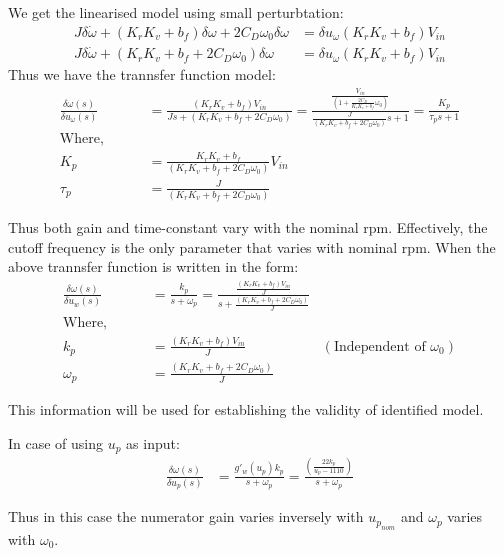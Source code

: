 
We get the linearised model using small perturbtation:
\begin{align*}
     J \delta \dot \omega + (K_r K_v + b_f) \delta \omega + 2 C_D \omega_0 \delta \omega  &= \delta u_\omega (K_r K_v  + b_f)  V_{in}\\
    J \delta \dot \omega + (K_r K_v + b_f + 2 C_D \omega_0) \delta \omega  &=\delta u_\omega (K_r K_v  + b_f)  V_{in}
\end{align*}
Thus we have the trannsfer function model:
\begin{align*}
    \frac{\delta \omega(s)}{\delta u_\omega (s)} &=
    \frac{(K_r K_v  + b_f)  V_{in}}{J s + (K_rK_v + b_f + 2 C_D \omega_0)} = \frac{\frac{V_{in}}{\left(1 + \frac{2 C_D}{K_r K_v + b_f} \omega_0 \right)}}{\frac{J}{(K_r K_v + b_f + 2 C_D \omega_0)}s + 1} = \frac{K_p}{\tau_p s + 1}\\
    \text{Where, }\qquad &\\
    K_p &= \frac{K_r K_v + b_f}{(K_rK_v + b_f + 2 C_D \omega_0)} V_{in}\\
    \tau_p &= \frac{J}{(K_rK_v + b_f + 2 C_D \omega_0)}
\end{align*}

Thus both gain and time-constant vary with the nominal rpm. Effectively, the cutoff frequency is the only parameter that varies with nominal rpm. When the above trannsfer function is written in the form:
\begin{align*}
    \frac{\delta \omega(s)}{\delta u_w(s)} &= \frac{k_p}{s + \omega_p} = \frac{\frac{(K_rK_v + b_f) V_{in}}{J}}{s + \frac{(K_rK_v + b_f + 2 C_D \omega_0)}{J}}\\
    \text{Where, } \qquad &\\
    k_p &= \frac{(K_rK_v + b_f) V_{in}}{J} & (\text{Independent of } \omega_0)\\
    \omega_p &= \frac{(K_rK_v + b_f + 2 C_D \omega_0)}{J}
\end{align*}

This information will be used for establishing the validity of identified model.

In case of using $u_p$ as input:
\begin{align*}
    \frac{\delta \omega(s)}{\delta u_p(s)} &= \frac{g'_w (u_p) k_p}{s + \omega_p} = \frac{\left(\frac{22 k_p}{u_p - 1110}\right)}{s + \omega_p}
\end{align*}

Thus in this case the numerator gain varies inversely with $u_{p_{nom}}$ and $\omega_p$ varies with $\omega_0$.

